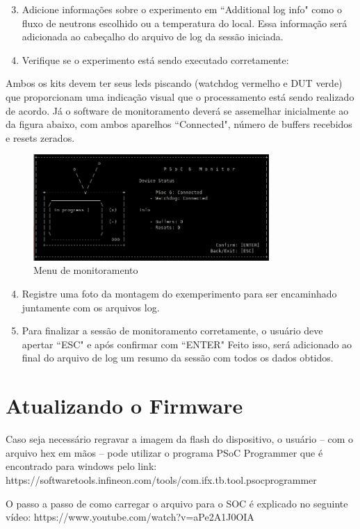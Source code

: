 \documentclass[12pt, a4paper]{article}
\begin{document}
\begin{enumerate}[leftmargin=1.3cm]
    \setcounter{enumi}{2}
    \item Adicione informações sobre o experimento em ``Additional log info" como o fluxo de neutrons escolhido ou a temperatura do local. Essa informação será adicionada ao cabeçalho do arquivo de log da sessão iniciada.

    \item Verifique se o experimento está sendo executado corretamente:
\end{enumerate}

Ambos os kits devem ter seus leds piscando (watchdog vermelho e DUT verde) que proporcionam uma indicação visual que o processamento está sendo realizado de acordo. Já o software de monitoramento deverá se assemelhar inicialmente ao da figura abaixo, com ambos aparelhos ``Connected", número de buffers recebidos e resets zerados. 

\begin{figure}[H]
    \centering
    \caption{Menu de monitoramento}
    \includegraphics[width=0.8\textwidth]{../imgs/monitoring.png}

    \vspace{0.5em}
    \label{fig:monitoring_menu}
\end{figure}

\begin{enumerate}[leftmargin=1.3cm]
    \setcounter{enumi}{3}

    \item Registre uma foto da montagem do exemperimento para ser encaminhado juntamente com os arquivos log.

    \item Para finalizar a sessão de monitoramento corretamente, o usuário deve apertar ``ESC" e após confirmar com ``ENTER"  Feito isso, será adicionado ao final do arquivo de log um resumo da sessão com todos os dados obtidos. 
\end{enumerate}

\section{Atualizando o Firmware}

Caso seja necessário regravar a imagem da flash do dispositivo, o usuário -- com o arquivo hex em mãos -- pode utilizar o programa PSoC Programmer que é encontrado para windows pelo link: https://softwaretools.infineon.com/tools/com.ifx.tb.tool.psocprogrammer


O passo a passo de como carregar o arquivo para o SOC é explicado no seguinte vídeo: https://www.youtube.com/watch?v=aPe2A1J0OIA
\end{document}
